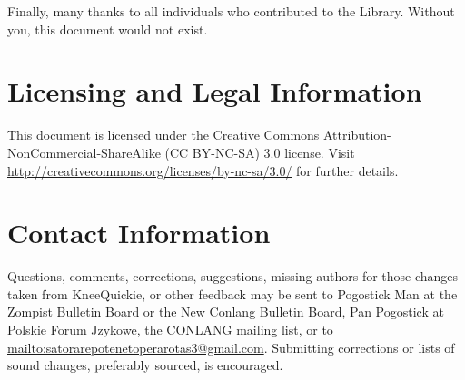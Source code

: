 \documentclass[11pt]{article}
\newcommand{\tab}{\hspace{25pt}}
\begin{document}
\tab Finally, many thanks to all individuals who contributed to the Library. Without you, this document would not exist.

\section{Licensing and Legal Information}\tab This document is licensed under the Creative Commons Attribution-NonCommercial-\hspace{0pt}ShareAlike (CC BY-NC-SA) 3.0 license. Visit \url{http://creativecommons.org/licenses/by-nc-sa/3.0/} for further details.

\section{Contact Information}\tab Questions, comments, corrections, suggestions, missing authors for those changes taken from KneeQuickie, or other feedback may be sent to Pogostick Man at the Zompist Bulletin Board or the New Conlang Bulletin Board, Pan Pogostick at Polskie Forum Jzykowe, the CONLANG mailing list, or to \url{mailto:satorarepotenetoperarotas3@gmail.com}. Submitting corrections or lists of sound changes, preferably sourced, is encouraged.\clearpage
\end{document}
